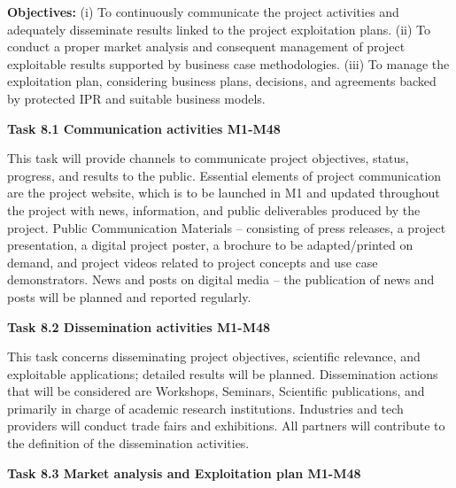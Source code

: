 
\begin{planactivitybody}
\textbf{Objectives:} (i) To continuously communicate the project
activities and adequately disseminate results linked to the project
exploitation plans. (ii) To conduct a proper market analysis and
consequent management of project exploitable results supported by
business case methodologies. (iii) To manage the exploitation plan,
considering business plans, decisions, and agreements backed by
protected IPR and suitable business models.

\plantaskskip
\textbf{Task 8.1 Communication activities M1-M48}

This task will provide channels to communicate project objectives,
status, progress, and results to the public. Essential elements of
project communication are the project website, which is to be launched
in M1 and updated throughout the project with news, information, and
public deliverables produced by the project. Public Communication
Materials -- consisting of press releases, a project presentation, a
digital project poster, a brochure to be adapted/printed on demand, and
project videos related to project concepts and use case demonstrators.
News and posts on digital media -- the publication of news and posts
will be planned and reported regularly.

\plantaskskip
\textbf{Task 8.2 Dissemination activities M1-M48}

This task concerns disseminating project objectives, scientific
relevance, and exploitable applications; detailed results will be
planned. Dissemination actions that will be considered are Workshops,
Seminars, Scientific publications, and primarily in charge of academic
research institutions. Industries and tech providers will conduct trade
fairs and exhibitions. All partners will contribute to the definition of
the dissemination activities.

\plantaskskip
\textbf{Task 8.3 Market analysis and Exploitation plan M1-M48}


\end{planactivitybody}
